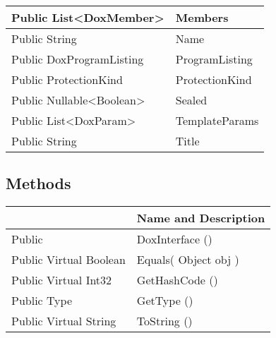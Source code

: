 \documentclass[11pt, oneside, a4paper]{book}
\begin{document}
\begin{center}
\begin{tabular}{| p{3cm} | p{12cm} | }
\hline
 Public  List<DoxMember> &  Members\hypertarget{SoftwareEngineeringTools.{}Documentation.{}DoxInterface.{}Members}{}\\
\hline
 Public  String &  Name\hypertarget{SoftwareEngineeringTools.{}Documentation.{}DoxInterface.{}Name}{}\\
\hline
 Public  DoxProgramListing &  ProgramListing\hypertarget{SoftwareEngineeringTools.{}Documentation.{}DoxInterface.{}ProgramListing}{}\\
\hline
 Public  ProtectionKind &  ProtectionKind\hypertarget{SoftwareEngineeringTools.{}Documentation.{}DoxInterface.{}ProtectionKind}{}\\
\hline
 Public  Nullable<Boolean> &  Sealed\hypertarget{SoftwareEngineeringTools.{}Documentation.{}DoxInterface.{}Sealed}{}\\
\hline
 Public  List<DoxParam> &  TemplateParams\hypertarget{SoftwareEngineeringTools.{}Documentation.{}DoxInterface.{}TemplateParams}{}\\
\hline
 Public  String &  Title\hypertarget{SoftwareEngineeringTools.{}Documentation.{}DoxInterface.{}Title}{}\\
\hline
\end{tabular}
\end{center}

\subsection{Methods}
\begin{center}
\begin{tabular}{| p{3cm} | p{12cm} | }
\hline
\textbf{ } & \textbf{ Name and Description}\\
\hline
 Public  &  DoxInterface ()\hypertarget{SoftwareEngineeringTools.{}Documentation.{}DoxInterface.{}DoxInterface}{}\\
\hline
 Public  Virtual  Boolean &  Equals(\hypertarget{SoftwareEngineeringTools.{}Documentation.{}DoxInterface.{}Equals\_Object}{} Object  obj  )\\
\hline
 Public  Virtual  Int32 &  GetHashCode ()\hypertarget{SoftwareEngineeringTools.{}Documentation.{}DoxInterface.{}GetHashCode}{}\\
\hline
 Public  Type &  GetType ()\hypertarget{SoftwareEngineeringTools.{}Documentation.{}DoxInterface.{}GetType}{}\\
\hline
 Public  Virtual  String &  ToString ()\hypertarget{SoftwareEngineeringTools.{}Documentation.{}DoxInterface.{}ToString}{}\\
\hline
\end{tabular}
\end{center}
 
\end{document}
